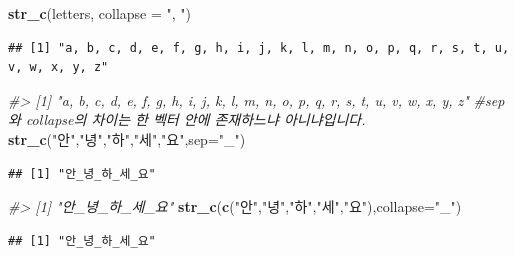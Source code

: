 \documentclass[10pt,]{krantz}
\makeatletter
\newenvironment{Shaded}{\begin{snugshade}}{\end{snugshade}}
\newcommand{\KeywordTok}[1]{\textcolor[rgb]{0.13,0.29,0.53}{\textbf{#1}}}
\newcommand{\DataTypeTok}[1]{\textcolor[rgb]{0.13,0.29,0.53}{#1}}
\newcommand{\StringTok}[1]{\textcolor[rgb]{0.31,0.60,0.02}{#1}}
\newcommand{\CommentTok}[1]{\textcolor[rgb]{0.56,0.35,0.01}{\textit{#1}}}
\newcommand{\NormalTok}[1]{#1}
\newenvironment{kframe}{%
\medskip{}
\setlength{\fboxsep}{.8em}
 \def\at@end@of@kframe{}%
 \ifinner\ifhmode%
  \def\at@end@of@kframe{\end{minipage}}%
  \begin{minipage}{\columnwidth}%
 \fi\fi%
 \def\FrameCommand##1{\hskip\@totalleftmargin \hskip-\fboxsep
 \colorbox{shadecolor}{##1}\hskip-\fboxsep
     \hskip-\linewidth \hskip-\@totalleftmargin \hskip\columnwidth}%
 \MakeFramed {\advance\hsize-\width
   \@totalleftmargin\z@ \linewidth\hsize
   \@setminipage}}%
 {\par\unskip\endMakeFramed%
 \at@end@of@kframe}
\renewenvironment{Shaded}{\begin{kframe}}{\end{kframe}}
\makeatother
\begin{document}
\begin{Shaded}
\begin{Highlighting}[]
\KeywordTok{str_c}\NormalTok{(letters, }\DataTypeTok{collapse =} \StringTok{", "}\NormalTok{)}
\end{Highlighting}
\end{Shaded}

\begin{verbatim}
## [1] "a, b, c, d, e, f, g, h, i, j, k, l, m, n, o, p, q, r, s, t, u, v, w, x, y, z"
\end{verbatim}

\begin{Shaded}
\begin{Highlighting}[]
\CommentTok{#> [1] "a, b, c, d, e, f, g, h, i, j, k, l, m, n, o, p, q, r, s, t, u, v, w, x, y, z"}
\CommentTok{#sep와 collapse의 차이는 한 벡터 안에 존재하느냐 아니냐입니다.}
\KeywordTok{str_c}\NormalTok{(}\StringTok{"안"}\NormalTok{,}\StringTok{"녕"}\NormalTok{,}\StringTok{"하"}\NormalTok{,}\StringTok{"세"}\NormalTok{,}\StringTok{"요"}\NormalTok{,}\DataTypeTok{sep=}\StringTok{"_"}\NormalTok{)}
\end{Highlighting}
\end{Shaded}

\begin{verbatim}
## [1] "안_녕_하_세_요"
\end{verbatim}

\begin{Shaded}
\begin{Highlighting}[]
\CommentTok{#> [1] "안_녕_하_세_요"  }
\KeywordTok{str_c}\NormalTok{(}\KeywordTok{c}\NormalTok{(}\StringTok{"안"}\NormalTok{,}\StringTok{"녕"}\NormalTok{,}\StringTok{"하"}\NormalTok{,}\StringTok{"세"}\NormalTok{,}\StringTok{"요"}\NormalTok{),}\DataTypeTok{collapse=}\StringTok{"_"}\NormalTok{)}
\end{Highlighting}
\end{Shaded}

\begin{verbatim}
## [1] "안_녕_하_세_요"
\end{verbatim}

\begin{Shaded}
\end{Shaded}
\end{document}
